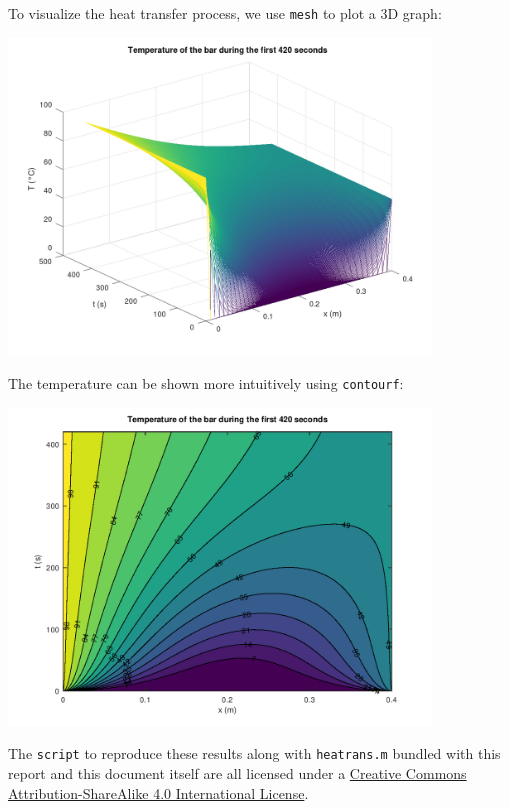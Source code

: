 \documentclass[a4paper,12pt]{article}
\begin{document}
\begin{enumerate}
    To visualize the heat transfer process, we use \verb|mesh| to plot
    a 3D graph:

    \includegraphics[width=0.841\textwidth]{mesh.png}

    The temperature can be shown more intuitively using \verb|contourf|:

    \includegraphics[width=0.841\textwidth]{contour.png}

    The \verb|script| to reproduce these results along with \verb|heatrans.m|
    bundled with this report and this document itself are all licensed under a
    \href{http://creativecommons.org/licenses/by-sa/4.0/}{Creative Commons
      Attribution-ShareAlike 4.0 International License}.
\end{enumerate}
\end{document}
